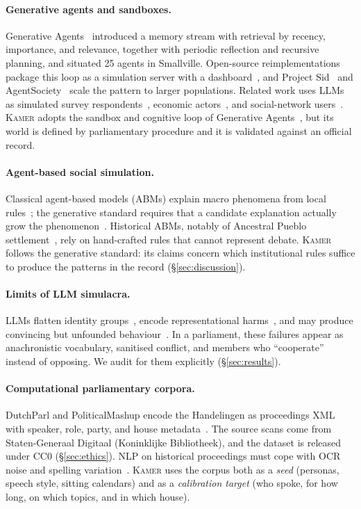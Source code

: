 \documentclass[sigconf,review,anonymous]{acmart}
\newcommand{\sys}{\textsc{Kamer}}
\begin{document}
\paragraph{Generative agents and sandboxes.} Generative
Agents~\cite{park2023generative} introduced a memory stream with retrieval
by recency, importance, and relevance, together with periodic reflection and
recursive planning, and situated 25 agents in Smallville. Open-source
reimplementations package this loop as a simulation server with a
dashboard~\cite{smallvillerepo}, and Project Sid~\cite{al2024projectsid} and
AgentSociety~\cite{piao2025agentsociety} scale the pattern to larger
populations. Related work uses LLMs as simulated survey
respondents~\cite{argyle2023outofone,aher2023turing}, economic
actors~\cite{horton2023homosilicus}, and social-network
users~\cite{gao2023s3,tornberg2023simulating}. \sys{} adopts the sandbox
and cognitive loop of Generative Agents~\cite{park2023generative}, but its
world is defined by parliamentary procedure and it is validated against an
official record.

\paragraph{Agent-based social simulation.} Classical agent-based models
(ABMs) explain macro phenomena from local
rules~\cite{schelling1971dynamic,epstein1996growing}; the generative
standard requires that a candidate explanation actually grow the
phenomenon~\cite{epstein2006generative}. Historical ABMs, notably of
Ancestral Pueblo settlement~\cite{axtell2002population}, rely on
hand-crafted rules that cannot represent debate. \sys{} follows the
generative standard: its claims concern which institutional rules suffice
to produce the patterns in the record (\S\ref{sec:discussion}).

\paragraph{Limits of LLM simulacra.} LLMs flatten identity
groups~\cite{wang2025identity}, encode representational
harms~\cite{bender2021parrots}, and may produce convincing but unfounded
behaviour~\cite{ziems2024css}. In a parliament, these failures appear as
anachronistic vocabulary, sanitised conflict, and members who
``cooperate'' instead of opposing. We audit for them explicitly
(\S\ref{sec:results}).

\paragraph{Computational parliamentary corpora.} DutchParl and
PoliticalMashup encode the Handelingen as proceedings XML with speaker,
role, party, and house metadata~\cite{marx2010dutchparl,marx2012dutchparl}.
The source scans come from Staten-Generaal Digitaal (Koninklijke
Bibliotheek), and the dataset is released under CC0 (\S\ref{sec:ethics}).
NLP on historical proceedings must cope with OCR noise and spelling
variation~\cite{ehrmann2023ner}. \sys{} uses the corpus both as a
\emph{seed} (personas, speech style, sitting calendars) and as a
\emph{calibration target} (who spoke, for how long, on which topics, and in
which house).
\end{document}
